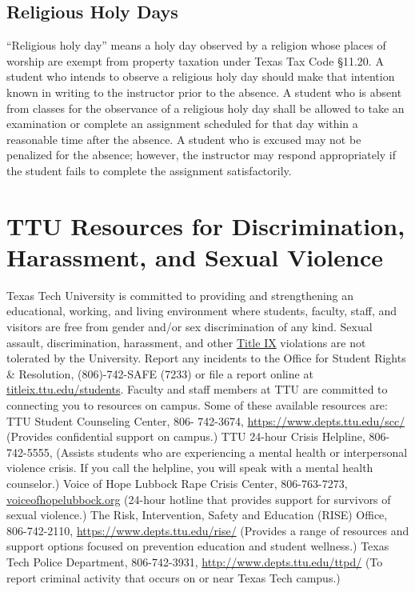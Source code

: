 \documentclass[12pt, notitlepage]{article}   	%
\begin{document}
{\subsection{Religious Holy Days}
“Religious holy day” means a holy day observed by a religion whose places of worship 
are exempt from property taxation under Texas Tax Code §11.20. 
A student who intends to observe a religious holy day should make that intention known 
in writing to the instructor prior to the absence. 
A student who is absent from classes for the observance of a religious holy day shall be 
allowed to take an examination or complete an assignment scheduled for that day within a 
reasonable time after the absence. 
A student who is excused may not be penalized for the absence; however, the instructor 
may respond appropriately if the student fails to complete the assignment satisfactorily.

\section{TTU Resources for Discrimination, Harassment, and Sexual Violence}
Texas Tech University is committed to providing and strengthening an
educational, working, and living environment where students, faculty, staff,
and visitors are free from gender and/or sex discrimination of any kind.
Sexual assault, discrimination, harassment, and other \href{https://www.depts.ttu.edu/titleix/}{Title IX}
violations are not tolerated by the University. Report any incidents to the
Office for Student Rights & Resolution, (806)-742-SAFE (7233) or file a
report online at \url{titleix.ttu.edu/students}. Faculty and staff members at TTU
are committed to connecting you to resources on campus. Some of these
available resources are: TTU Student Counseling Center, 806- 742-3674,
\url{https://www.depts.ttu.edu/scc/} (Provides confidential support on
campus.) TTU 24-hour Crisis Helpline, 806-742-5555, (Assists students
who are experiencing a mental health or interpersonal violence crisis. If you
call the helpline, you will speak with a mental health counselor.) Voice of
Hope Lubbock Rape Crisis Center, 806-763-7273,
\url{voiceofhopelubbock.org} (24-hour hotline that provides support for
survivors of sexual violence.) The Risk, Intervention, Safety and Education
(RISE) Office, 806-742-2110, \url{https://www.depts.ttu.edu/rise/} (Provides a
range of resources and support options focused on prevention education
and student wellness.) Texas Tech Police Department, 806-742-3931,
\url{http://www.depts.ttu.edu/ttpd/} (To report criminal activity that occurs on
or near Texas Tech campus.)

}
\end{document}
